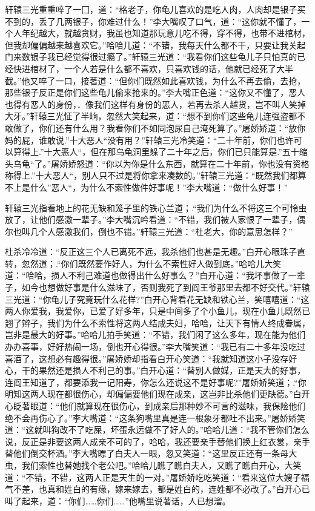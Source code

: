 \documentclass[12pt,oneside]{book}
\begin{document}
轩辕三光重重啐了一囗，道：``格老子，你龟儿喜欢的是吃人肉，人肉却是银子买不到的，丢了几两银子，你难过什么！''李大嘴叹了口气，道：``这你就不懂了，一个人年纪越大，就越贪财，我虽也知道那玩意儿吃不得，穿不得，也带不进棺材，但我却偏偏越来越喜欢它。''哈哈儿道：``不错，我每天什么都不干，只要让我关起门来数银子我已经觉得很过瘾了。''轩辕三光道：``我看你们这些龟儿子只怕真的已经快进棺材了，一个人若是什么都不喜欢，只喜欢钱的话，他就已经死了大半截。''他又啐了一口，接著道：``但你们既然如此喜欢钱，为什么不再去偷，去抢，那些银子反正是你们这些龟儿偷来抢来的。''李大嘴正色道：``这你又不懂了，恶人也得有恶人的身份，．像我们这样有身份的恶人，若再去杀人越货，岂不叫人笑掉大牙。''轩辕三光怔了半晌，忽然大笑起来，道：``想不到你们这些龟儿连强盗都不敢做了，你们还有什么用？我看你们不如同泡尿自己淹死算了。''屠娇娇道：``放你妈的屁，谁敢说.''十大恶人``没有用？''轩辕三光冷笑道：``二十年前，你们也许可以算得上.''十大恶人``，但在那乌龟洞里躲了二十年之后，你们已只能算是.''五十缩头乌龟``了。''屠娇娇怒道：``你以为你是什么东西，就算在二十年前，你也没有资格称得上.''十大恶人``，别人只不过是将你拿来凑数的。''轩辕三光道：``既然我们都算不上是什么''恶人``，为什么不索性做件好事呢！''李大嘴道：``做什么好事！''

轩辕三光指看地上的花无缺和笼子里的铁心兰道；.``我们为什么不将这三个可怜虫放了，让他们感激一辈子。''李大嘴沉吟看道：``不错，我们被人家恨了一辈子，偶尔也叫几个人感激我们，倒也不错。''轩辕三光道：``杜老大，你的意思怎样？''

杜杀冷冷道：``反正这三个人已离死不远，我杀他们也甚是无趣。''白开心眼珠子直转，忽然道；.``你们既然要作好人，为什么不索性好人做到底。''哈哈儿大笑道：``哈哈，损人不利己难道也做得出什么好事么？''白开心道：``我坏事做了一辈子，如今也想做好事是什么滋味了，否则我死了到阎王爷那里去都不好交代。''轩辕三光道：``你龟儿子究竟玩什么花样?''白开心背看花无缺和铁心兰，笑嘻嘻道：``这两人你爱我，我爱你，已爱了好多年，只是中间多了个小鱼儿，现在小鱼儿既然已翘了辫子，我们为什么不索性将这两人结成夫妇，哈哈，让天下有情人终成眷属，岂非是最大的好事。''哈哈儿拍手笑道：``不错，我们闲了这么多年，现在能为他们办办喜事，好好热闹一场，倒也开心得很。''李大嘴笑道：``我已有二十多年没吃过喜酒了，这想必有趣得很。''屠娇娇却指看白开心笑道：``我就知道这小子没存好心，干的果然还是损人不利己的事。''白开心道：``替别人做媒，正是天大的好事，连阎王知道了，都要添我一记阳寿，你怎么还说这不是好事呢?''屠娇娇笑道；.``你明知这两人现在都很伤心，却偏偏要他们现在成亲，这岂非比杀他们更缺德。''白开心眨著眼道：``他们就算现在很伤心，到成亲后那种妙不可言的滋味，我保险他们绝不会再伤心了。''李大嘴道：``这条狗嘴里真是连一根象牙都吐不出来。''屠娇娇笑道：``这就叫狗改不了吃屎，坏蛋永远做不了好人的。''哈哈儿道：``我不管你们怎么说，反正是非要这两人成亲不可的了，哈哈，我还要亲手替他们换上红衣裳，亲手替他们倒交杯酒。''李大嘴瞟了白夫人一眼，忽又笑道：``这里反正还有一条母大虫，我们索性也替她找个老公吧。''哈哈儿瞧了瞧白夫人，又瞧了瞧白开心，大笑道：``不错，不错，这两人正是天生的一对。''屠娇娇吃吃笑道：``看来这位大嫂子福气不差，也真和姓白的有缘，嫁来嫁去，都是姓白的，连姓都不必改了。''白开心已叫了起来，道：``你们\ldots\ldots 你们\ldots\ldots{}''他嘴里说著话，人已想溜。
\end{document}
